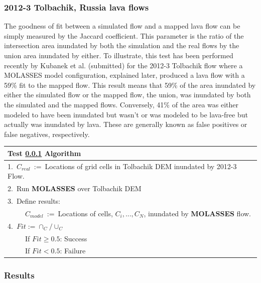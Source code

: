 \documentclass[12pt,letter]{article}
\newcommand{\tabitem}{~~\llap{\textbullet}~~}
\newcommand{\tabitem}{~~\llap{\textbullet}~~}
\begin{document}
		\subsubsection{2012-3 Tolbachik, Russia lava flows}\label{test:Real_Tolbachik}
			The goodness of fit between a simulated flow and a mapped lava flow can be simply measured by the Jaccard coefficient. This parameter is the ratio of the intersection area inundated by both the simulation and the real flows by the union area inundated by either. To illustrate, this test has been performed recently by Kubanek et al. (submitted) for the 2012-3 Tolbachik flow where a MOLASSES model configuration, explained later, produced a lava flow with a 59\% fit to the mapped flow. This result means that 59\% of the area inundated by either the simulated flow or the mapped flow, the union, was inundated by both the simulated and the mapped flows. Conversely, 41\% of the area was either modeled to have been inundated but wasn't or was modeled to be lava-free but actually was inundated by lava. These are generally known as false positives or false negatives, respectively.
			

			\begin{center}
				\begin{tabular}{l}
					\toprule
					\textbf{Test \ref{test:Real_Tolbachik} Algorithm}\\
					\midrule
					1.~$C_{real}$~:=~Locations of grid cells in Tolbachik DEM inundated by 2012-3 Flow.\\
					2.~Run \textbf{MOLASSES} over Tolbachik DEM\\
					3.~Define results:\\
						~\tabitem $C_{model}$~:=~Locations of cells, $C_i,...,C_N$, inundated by \textbf{MOLASSES} flow.\\
					4.~$Fit:=\cap_C/\cup_C$\\
						~\tabitem If $Fit\ge0.5$: Success\\
						~\tabitem If $Fit<0.5$: Failure\\
					\bottomrule
				\end{tabular}
			\end{center}
			
	\subsubsection{Results}
	
\end{document}
